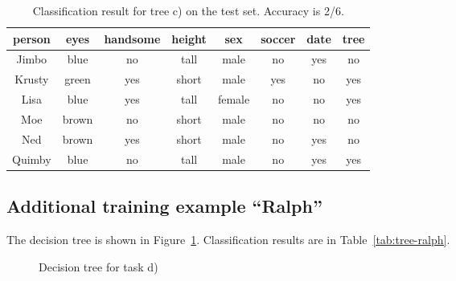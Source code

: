 \begin{table}[h!]
  \centering
  \begin{tabular}{cccccc|c|c}
    \toprule
    person      & eyes  & handsome & height & sex    & soccer & date & tree\\
    \midrule
    Jimbo       & blue  & no       & tall   & male   & no     & yes & no \\
    Krusty      & green & yes      & short  & male   & yes    & no  & yes\\
    Lisa        & blue  & yes      & tall   & female & no     & no  & yes\\
    Moe         & brown & no       & short  & male   & no     & no  & no \\
    Ned         & brown & yes      & short  & male   & no     & yes & no \\
    Quimby      & blue  & no       & tall   & male   & no     & yes & yes\\
    \bottomrule
  \end{tabular}
  \caption{Classification result for tree c) on the test set. Accuracy is 2/6.}
  \label{tab:tree-itchyno}
\end{table}

\subsection{Additional training example ``Ralph''}

The decision tree is shown in Figure~\ref{fig:tree-ralph}.
Classification results are in Table~\ref{tab:tree-ralph}.

\begin{figure}
\centering 
{}
\caption{Decision tree for task d)}
\label{fig:tree-ralph}
\end{figure}

